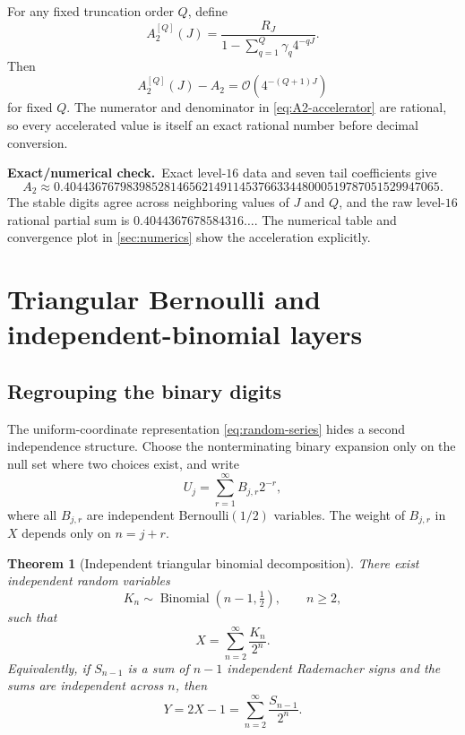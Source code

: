 \documentclass[11pt,oneside]{article}
\newtheorem{theorem}{Theorem}[section]
\theoremstyle{definition}
\theoremstyle{remark}
\newcommand{\bigO}{\mathcal O}
\newcommand{\1}{\mathbf 1}
\newcommand{\numerical}{\textcolor{newgreen}{\textbf{Exact/numerical check.}}\ }
\begin{document}
For any fixed truncation order $Q$, define
\begin{equation}
 A_2^{[Q]}(J)=
 \frac{R_J}{1-\sum_{q=1}^{Q}\gamma_q4^{-qJ}}.            \label{eq:A2-accelerator}
\end{equation}
Then
\begin{equation}
 A_2^{[Q]}(J)-A_2=\bigO(4^{-(Q+1)J})                    \label{eq:A2-accelerator-error}
\end{equation}
for fixed $Q$.  The numerator and denominator in
\eqref{eq:A2-accelerator} are rational, so every accelerated value is itself
an exact rational number before decimal conversion.

\numerical Exact level-$16$ data and seven tail coefficients give
\begin{equation}
 A_2\approx
 0.404436767983985281465621491145376633448000519787051529947065. \label{eq:A2-decimal}
\end{equation}
The stable digits agree across neighboring values of $J$ and $Q$, and the raw
level-$16$ rational partial sum is
$0.4044367678584316\ldots$.  The numerical table and convergence plot in
\cref{sec:numerics} show the acceleration explicitly.

\section{Triangular Bernoulli and independent-binomial layers}
\label{sec:triangular}

\subsection{Regrouping the binary digits}

The uniform-coordinate representation \eqref{eq:random-series} hides a second
independence structure.  Choose the nonterminating binary expansion only on
the null set where two choices exist, and write
\begin{equation}
 U_j=\sum_{r=1}^\infty B_{j,r}2^{-r},                    \label{eq:uniform-bits}
\end{equation}
where all $B_{j,r}$ are independent Bernoulli$(1/2)$ variables.  The weight of
$B_{j,r}$ in $X$ depends only on $n=j+r$.

\begin{theorem}[Independent triangular binomial decomposition]
\label{thm:triangular-binomial}
There exist independent random variables
\begin{equation}
 K_n\sim\operatorname{Binomial}(n-1,\tfrac12),
 \qquad n\ge2,                                           \label{eq:Kn-law}
\end{equation}
such that
\begin{equation}
 \boxed{\displaystyle
 X=\sum_{n=2}^\infty\frac{K_n}{2^n}.}                    \label{eq:X-triangular}
\end{equation}
Equivalently, if $S_{n-1}$ is a sum of $n-1$ independent Rademacher signs and
the sums are independent across $n$, then
\begin{equation}
 \boxed{\displaystyle
 Y=2X-1=\sum_{n=2}^\infty\frac{S_{n-1}}{2^n}.}           \label{eq:Y-triangular}
\end{equation}
\end{theorem}
\end{document}
